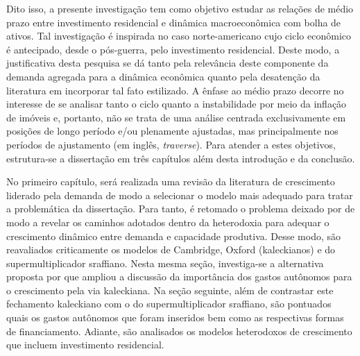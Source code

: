 Dito isso, a presente investigação tem como objetivo estudar as relações de médio prazo entre investimento residencial e dinâmica macroeconômica com bolha de ativos. 
Tal investigação é inspirada no caso norte-americano cujo ciclo econômico é antecipado, desde o pós-guerra, pelo investimento residencial. Deste modo, a justificativa desta pesquisa se dá tanto pela relevância deste componente da demanda agregada para a dinâmica econômica quanto pela desatenção da literatura em incorporar tal fato estilizado. 
A ênfase ao médio prazo decorre no interesse de se analisar tanto o ciclo quanto a instabilidade por meio da inflação de imóveis e, portanto, não se trata de uma análise centrada exclusivamente em posições de longo período e/ou plenamente ajustadas, mas principalmente nos períodos de ajustamento (em inglês, \textit{traverse}).
Para atender a estes objetivos, estrutura-se a dissertação em três capítulos além desta introdução e da conclusão.

No primeiro capítulo, será realizada uma revisão da literatura de crescimento liderado pela demanda de modo a selecionar o modelo mais adequado para tratar a problemática da dissertação. Para tanto, é retomado o problema deixado por \textcite{harrod_essay_1939} de modo a revelar os caminhos adotados dentro da heterodoxia para adequar o crescimento dinâmico entre demanda e capacidade produtiva. Desse modo, são reavaliados criticamente os modelos de Cambridge, Oxford (kaleckianos) e do supermultiplicador sraffiano. 
Nesta mesma seção, investiga-se a alternativa proposta por \textcite{allain_tackling_2015} que 
ampliou a discussão da importância dos gastos autônomos para o crescimento pela via kaleckiana. 
Na seção seguinte, além de contrastar este fechamento kaleckiano com o do supermultiplicador sraffiano, são pontuados quais os gastos autônomos que foram inseridos bem como as respectivas formas de financiamento.
Adiante, são analisados os modelos heterodoxos de crescimento que incluem investimento residencial. %




